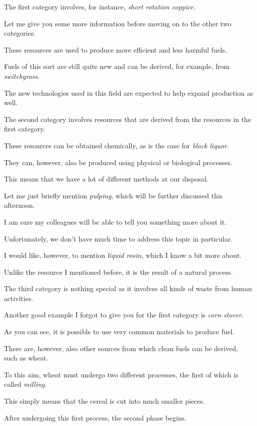 The first category involves, for instance, \textit{short rotation coppice}.

Let me give you some more information before moving on to the other two categories.

\ex These resources are used to produce more efficient and less harmful fuels.

Fuels of this sort are still quite new and can be derived, for example, from \textit{switchgrass}.

The new technologies used in this field are expected to help expand production as well.

\ex The second category involves resources that are derived from the resources in the first category.

These resources can be obtained chemically, as is the case for \textit{black liquor}.

They can, however, also be produced using physical or biological processes.

\ex This means that we have a lot of different methods at our disposal.

Let me just briefly mention \textit{pulping}, which will be further discussed this afternoon.

I am sure my colleagues will be able to tell you something more about it.

\ex Unfortunately, we don't have much time to address this topic in particular.

I would like, however, to mention \textit{liquid rosin}, which I know a bit more about.

Unlike the resource I mentioned before, it is the result of a natural process. 

\ex The third category is nothing special as it involves all kinds of waste from human activities.

Another good example I forgot to give you for the first category is \textit{corn stover}.

As you can see, it is possible to use very common materials to produce fuel.

\ex There are, however, also other sources from which clean fuels can be derived, such as wheat.

To this aim, wheat must undergo two different processes, the first of which is called \textit{milling}.

This simply means that the cereal is cut into much smaller pieces.

\ex After undergoing this first process, the second phase begins.


